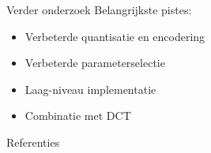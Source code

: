 \documentclass[t,12pt,dutch
\ifx\beamermode\undefined\else,\beamermode\fi
]{beamer}
\begin{document}
\begin{frame}{Verder onderzoek}
Belangrijkste pistes:
\begin{itemize}
\item Verbeterde quantisatie en encodering
\item Verbeterde parameterselectie
\item Laag-niveau implementatie
\item Combinatie met DCT
\end{itemize}
\end{frame}

\begin{frame}{Referenties}
	\scriptsize
	
	
	\normalsize
\end{frame}
\end{document}
